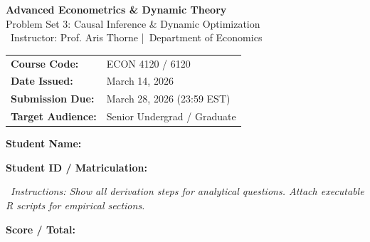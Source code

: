 \documentclass[11pt,a4paper]{article}
\begin{document}
\begin{tcolorbox}[
    enhanced,
    colback=NavyPrimary,
    coltext=white,
    arc=3.5pt,
    boxrule=0pt,
    left=10pt, right=10pt, top=6pt, bottom=6pt
]
\begin{minipage}[c]{0.54\linewidth}
    {\Large\sffamily\bfseries Advanced Econometrics \& Dynamic Theory}\\[2pt]
    {\large\sffamily\color{TealAccent!40} Problem Set 3: Causal Inference \& Dynamic Optimization}\\[3pt]
    {\scriptsize\sffamily\color{white!85}\faChalkboardTeacher\ Instructor: Prof. Aris Thorne \quad|\quad \faGraduationCap\ Department of Economics}
\end{minipage}%
\begin{minipage}[c]{0.44\linewidth}
    \raggedleft
    \scriptsize\sffamily
    \begin{tabular}{ll}
        \textbf{Course Code:} & ECON 4120 / 6120 \\
        \textbf{Date Issued:} & March 14, 2026 \\
        \textbf{Submission Due:} & March 28, 2026 (23:59 EST) \\
        \textbf{Target Audience:} & Senior Undergrad / Graduate
    \end{tabular}
\end{minipage}
\end{tcolorbox}

\vspace{1pt}

\begin{tcolorbox}[infobox]
    \scriptsize\sffamily
    \begin{minipage}[c]{0.48\linewidth}
        \textbf{Student Name:} \underline{\hspace{4.2cm}}
    \end{minipage}%
    \begin{minipage}[c]{0.52\linewidth}
        \raggedleft
        \textbf{Student ID / Matriculation:} \underline{\hspace{3.4cm}}
    \end{minipage}
    \par\vspace{2pt}
    \begin{minipage}[c]{0.74\linewidth}
        \color{CharcoalText}\faInfoCircle\ \textit{Instructions: Show all derivation steps for analytical questions. Attach executable R scripts for empirical sections.}
    \end{minipage}%
    \begin{minipage}[c]{0.26\linewidth}
        \raggedleft
        \textbf{Score / Total:} 
    \end{minipage}
\end{tcolorbox}
\end{document}
